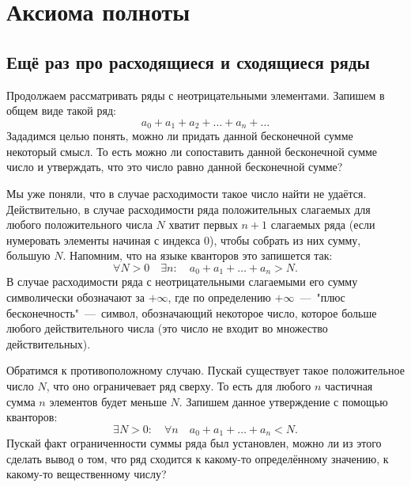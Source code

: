 \documentclass[12pt]{article}
\begin{document}
\section{Аксиома полноты}
\subsection{Ещё раз про расходящиеся и сходящиеся ряды}
Продолжаем рассматривать ряды с неотрицательными элементами. Запишем в общем виде такой ряд:
\begin{equation}\label{eq:15}
    a_0 + a_1 + a_2 + \ldots + a_n + \ldots
\end{equation}
Зададимся целью понять, можно ли придать данной бесконечной сумме некоторый смысл. То есть можно ли сопоставить данной бесконечной сумме число и утверждать, что это число равно данной бесконечной сумме?
\par
Мы уже поняли, что в случае расходимости такое число найти не удаётся. Действительно, в случае расходимости ряда положительных слагаемых для любого положительного числа $N$ хватит первых $n + 1$ слагаемых ряда (если нумеровать элементы начиная с индекса $0$), чтобы собрать из них сумму, большую $N$. Напомним, что на языке кванторов это запишется так:
\begin{equation}
    \forall N > 0 \quad \exists n: \quad a_0 + a_1 + \ldots + a_n > N.
\end{equation}
В случае расходимости ряда с неотрицательными слагаемыми его сумму символически обозначают за $+\infty$, где по определению $+\infty$~\----~"плюс бесконечность"{}~\----~символ, обозначающий некоторое число, которое больше любого действительного числа (это число не входит во множество действительных).
\par
Обратимся к противоположному случаю. Пускай существует такое положительное число $N$, что оно ограничевает ряд сверху. То есть для любого $n$ частичная сумма $n$ элементов будет меньше $N$. Запишем данное утверждение с помощью кванторов:
\begin{equation}\label{eq:17}
    \exists N>0: \quad \forall n \quad a_0+a_1+\ldots+a_n<N.
\end{equation}
Пускай факт ограниченности суммы ряда был установлен, можно ли из этого сделать вывод о том, что ряд сходится к какому\--то определённому значению, к какому\--то вещественному числу?
\end{document}
